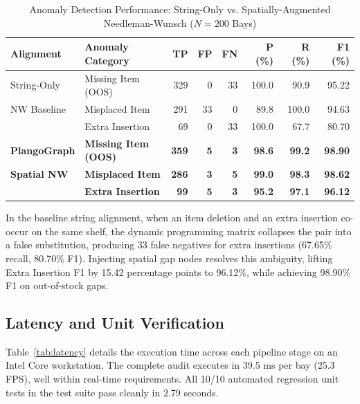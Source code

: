 \documentclass[conference]{IEEEtran}
\begin{document}
\begin{table}[h]
\centering
\caption{Anomaly Detection Performance: String-Only vs. Spatially-Augmented Needleman-Wunsch ($N=200$ Bays)}
\label{tab:anom_ablation}
\scriptsize
\begin{tabularx}{\columnwidth}{l l r r r r r r}
\toprule
\textbf{Alignment} & \textbf{Anomaly Category} & \textbf{TP} & \textbf{FP} & \textbf{FN} & \textbf{P (\%)} & \textbf{R (\%)} & \textbf{F1 (\%)} \\
\midrule
String-Only & Missing Item (OOS) & 329 & 0 & 33 & 100.0 & 90.9 & 95.22 \\
NW Baseline & Misplaced Item & 291 & 33 & 0 & 89.8 & 100.0 & 94.63 \\
            & Extra Insertion & 69 & 0 & 33 & 100.0 & 67.7 & 80.70 \\
\midrule
\textbf{PlangoGraph} & \textbf{Missing Item (OOS)} & \textbf{359} & \textbf{5} & \textbf{3} & \textbf{98.6} & \textbf{99.2} & \textbf{98.90} \\
\textbf{Spatial NW}   & \textbf{Misplaced Item} & \textbf{286} & \textbf{3} & \textbf{5} & \textbf{99.0} & \textbf{98.3} & \textbf{98.62} \\
                     & \textbf{Extra Insertion} & \textbf{99} & \textbf{5} & \textbf{3} & \textbf{95.2} & \textbf{97.1} & \textbf{96.12} \\
\bottomrule
\end{tabularx}
\end{table}

In the baseline string alignment, when an item deletion and an extra insertion co-occur on the same shelf, the dynamic programming matrix collapses the pair into a false substitution, producing 33 false negatives for extra insertions (67.65\% recall, 80.70\% F1). Injecting spatial gap nodes resolves this ambiguity, lifting Extra Insertion F1 by 15.42 percentage points to 96.12\%, while achieving 98.90\% F1 on out-of-stock gaps.

\subsection{Latency and Unit Verification}
Table~\ref{tab:latency} details the execution time across each pipeline stage on an Intel Core workstation. The complete audit executes in 39.5 ms per bay (25.3 FPS), well within real-time requirements. All 10/10 automated regression unit tests in the test suite pass cleanly in 2.79 seconds.
\end{document}

